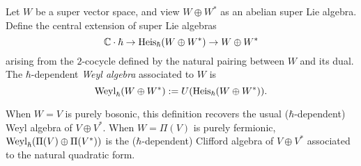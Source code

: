 \begin{dfn}
Let $W$ be a super vector space, and view $W \oplus W^*$ as an abelian super Lie algebra. 
Define the central extension of super Lie algebras
\[
\mathbb C \cdot \hbar \to {\rm Heis}_\hbar (W \oplus W^*) \to W \oplus W^*
\]
arising from the $2$-cocycle defined by the natural pairing between $W$ and its dual. 
The $\hbar$-dependent {\em Weyl algebra} associated to $W$ is
\[
{\rm Weyl}_\hbar(W \oplus W^*) := U({\rm Heis}_\hbar(W \oplus W^*)) .
\]
\end{dfn}

\begin{rmk}
When $W = V$ is purely bosonic, this definition recovers the usual ($\hbar$-dependent) Weyl algebra of $V \oplus V^*$. 
When $W = \Pi(V)$ is purely fermionic, ${\rm Weyl}_\hbar(\Pi(V) \oplus \Pi(V^*))$ is the ($\hbar$-dependent) Clifford algebra of $V\oplus V^*$ associated to the natural quadratic form.  
\end{rmk} 

